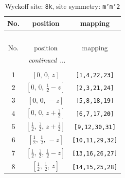 \documentclass[fleqn,8pt]{jsarticle}
\begin{document}
\begin{longtable}{ccc}
\caption{Wyckoff site: {\tt 8k}, site symmetry: {\tt m'm'2}}
 \\
 \hline \hline
No. & position & mapping \\ \hline \endfirsthead

\multicolumn{2}{l}{\tablename\ \thetable{}} \\
 \hline \hline
No. & position & mapping \\ \hline \endhead

 \hline \hline
\multicolumn{2}{r}{\footnotesize\it continued ...} \\ \endfoot

 \hline \hline
\multicolumn{2}{r}{} \\ \endlastfoot

1 & $\left[ 0,\, 0,\, z \right]$ & {\tt [1,4,22,23]} \\ \hline
2 & $\left[ 0,\, 0,\, \frac{1}{2} - z \right]$ & {\tt [2,3,21,24]} \\ \hline
3 & $\left[ 0,\, 0,\, - z \right]$ & {\tt [5,8,18,19]} \\ \hline
4 & $\left[ 0,\, 0,\, z + \frac{1}{2} \right]$ & {\tt [6,7,17,20]} \\ \hline
5 & $\left[ \frac{1}{2},\, \frac{1}{2},\, z + \frac{1}{2} \right]$ & {\tt [9,12,30,31]} \\ \hline
6 & $\left[ \frac{1}{2},\, \frac{1}{2},\, - z \right]$ & {\tt [10,11,29,32]} \\ \hline
7 & $\left[ \frac{1}{2},\, \frac{1}{2},\, \frac{1}{2} - z \right]$ & {\tt [13,16,26,27]} \\ \hline
8 & $\left[ \frac{1}{2},\, \frac{1}{2},\, z \right]$ & {\tt [14,15,25,28]} \\
\end{longtable}
\renewcommand{\arraystretch}{1.2}
\end{document}
